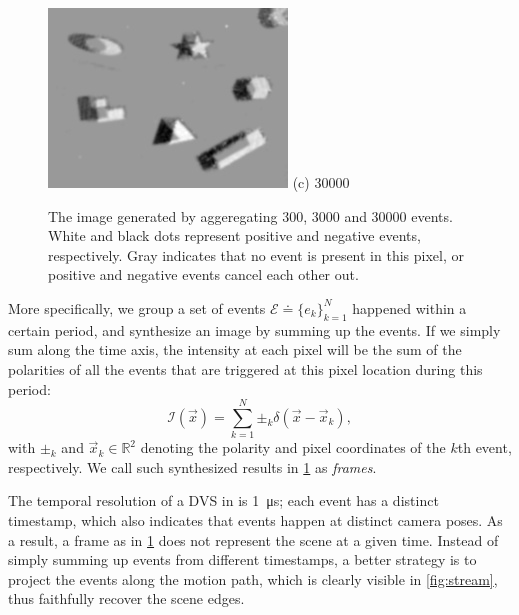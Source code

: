 \begin{figure}[h]
\begin{minipage}[t]{0.3\textwidth}
    \centering \includegraphics[width = \textwidth]{images/30000.jpg}
    (c) \num{30000}
  \end{minipage}
  \caption{The image generated by aggeregating \num{300}, \num{3000}
    and \num{30000} events. White and black dots represent positive
    and negative events, respectively. Gray indicates that no event is
    present in this pixel, or positive and negative events cancel each
    other out.}
  \label{fig:window_size_3}
\end{figure}
More specifically, we group a set of events
$\mathscr{E}\doteq \{e_k\}_{k=1}^N$ happened within a certain period,
and synthesize an image by summing up the events. If we simply sum
along the time axis, the intensity at each pixel will be the sum of
the polarities of all the events that are triggered at this pixel
location during this period:
\begin{equation}
  \label{eq:intensity}
  \mathcal{I}(\vec{x}) = \sum_{k=1}^N\pm_k\delta(\vec{x}-\vec{x}_k),
\end{equation}
with $\pm_k$ and $\vec{x}_k\in\mathbb{R}^2$ denoting the polarity and
pixel coordinates of the $k$th event, respectively. We call such
synthesized results in \cref{fig:window_size_3} as \emph{frames}.

The temporal resolution of a DVS in \citep{brandli2014240} is
\SI{1}{\micro s}; each event has a distinct timestamp, which also
indicates that events happen at distinct camera poses. As a result, a
frame as in \cref{fig:window_size_3} does not represent the scene at a
given time. Instead of simply summing up events from different
timestamps, a better strategy is to project the events along the
motion path, which is clearly visible in \cref{fig:stream}, thus
faithfully recover the scene edges.

